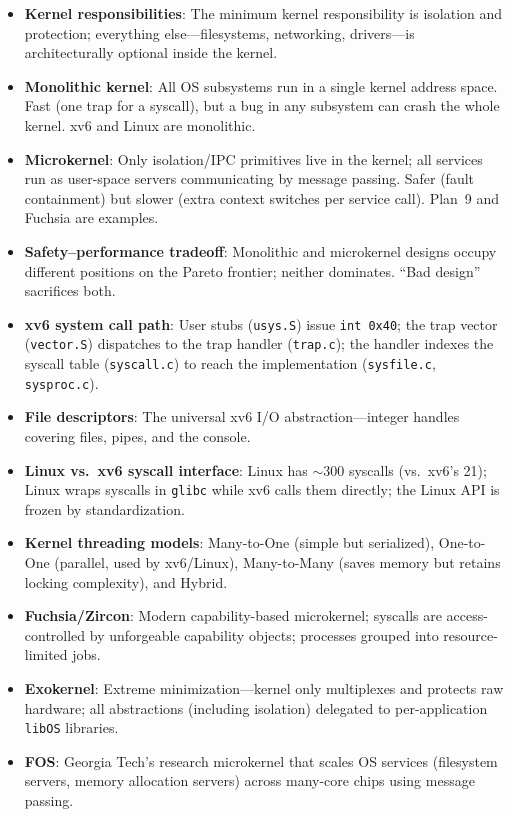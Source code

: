 \documentclass[11pt]{article}
\begin{document}
\begin{itemize}
    \item \textbf{Kernel responsibilities}: The minimum kernel responsibility is isolation and protection; everything else---filesystems, networking, drivers---is architecturally optional inside the kernel.
    \item \textbf{Monolithic kernel}: All OS subsystems run in a single kernel address space. Fast (one trap for a syscall), but a bug in any subsystem can crash the whole kernel. xv6 and Linux are monolithic.
    \item \textbf{Microkernel}: Only isolation/IPC primitives live in the kernel; all services run as user-space servers communicating by message passing. Safer (fault containment) but slower (extra context switches per service call). Plan~9 and Fuchsia are examples.
    \item \textbf{Safety--performance tradeoff}: Monolithic and microkernel designs occupy different positions on the Pareto frontier; neither dominates. ``Bad design'' sacrifices both.
    \item \textbf{xv6 system call path}: User stubs (\texttt{usys.S}) issue \texttt{int 0x40}; the trap vector (\texttt{vector.S}) dispatches to the trap handler (\texttt{trap.c}); the handler indexes the syscall table (\texttt{syscall.c}) to reach the implementation (\texttt{sysfile.c}, \texttt{sysproc.c}).
    \item \textbf{File descriptors}: The universal xv6 I/O abstraction---integer handles covering files, pipes, and the console.
    \item \textbf{Linux vs.\ xv6 syscall interface}: Linux has $\sim$300 syscalls (vs.\ xv6's 21); Linux wraps syscalls in \texttt{glibc} while xv6 calls them directly; the Linux API is frozen by standardization.
    \item \textbf{Kernel threading models}: Many-to-One (simple but serialized), One-to-One (parallel, used by xv6/Linux), Many-to-Many (saves memory but retains locking complexity), and Hybrid.
    \item \textbf{Fuchsia/Zircon}: Modern capability-based microkernel; syscalls are access-controlled by unforgeable capability objects; processes grouped into resource-limited jobs.
    \item \textbf{Exokernel}: Extreme minimization---kernel only multiplexes and protects raw hardware; all abstractions (including isolation) delegated to per-application \texttt{libOS} libraries.
    \item \textbf{FOS}: Georgia Tech's research microkernel that scales OS services (filesystem servers, memory allocation servers) across many-core chips using message passing.
\end{itemize}
\end{document}
